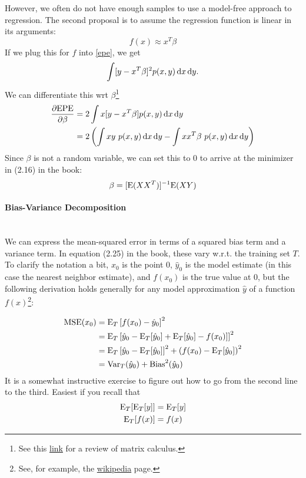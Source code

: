 However, we often do not have enough samples to use a model-free approach to regression. The second proposal is to assume the regression function is linear in its arguments:
$$
f(x) \approx x^T \beta
$$
If we plug this for $f$ into \eqref{epe}, we get
$$
\int [y - x^T \beta]^2 p(x, y) \operatorname{d}\!{x} \operatorname{d}\!{y}.
$$
We can differentiate this wrt $\beta$\footnote{See this \href{https://www.matrixcalculus.org/}{link} for a review of matrix calculus.}
\begin{align*}
  \frac{\partial \mathrm{EPE}}{\partial \beta} &= 2 \int x [y - x^T \beta] p(x, y) \d x \d y\\
                                               &= 2\left(\int x y\ p(x, y)\d x \d y - \int xx^T\beta\ p(x, y) \d x \d y\right)
\end{align*}
Since $\beta$ is not a random variable, we can set this to $0$ to arrive at the minimizer in (2.16) in the book:
$$
\beta = [\mathrm{E} (XX^T)]^{-1} \mathrm{E} (XY)
$$

\paragraph{Bias-Variance Decomposition}\mbox{} \\

We can express the mean-squared error in terms of a squared bias term and a variance term. In equation (2.25) in the book, these vary w.r.t. the training set $T$. To clarify the notation a bit, 
$x_0$ is the point $0$, $\hat{y}_0$ is the model estimate (in this case the nearest neighbor estimate), and $f(x_0)$ is the true value at $0$, but the following derivation holds generally for any model approximation $\hat{y}$ of a function $f(x)$\footnote{See, for example, the \href{https://en.wikipedia.org/wiki/Bias-variance_tradeoff}{wikipedia} page.}:

\begin{align*}
  \mathrm{MSE}(x_0) &= \mathrm{E}_{T}\left[f(x_0) - \hat{y}_0\right]^2\\
                    &= \mathrm{E}_{T}\left[\hat{y}_0 - \mathrm{E}_{T}[\hat{y}_0] + \mathrm{E}_{T}[\hat{y}_0] - f(x_0)]\right]^2\\
                    &= \mathrm{E}_{T}\left[\hat{y}_0 - \mathrm{E}_{T}[\hat{y}_0]\right]^2 + \left(f(x_0) - \mathrm{E}_{T}[\hat{y}_0]\right)^2\\
                    &= \mathrm{Var}_{T}(\hat{y}_0) + \mathrm{Bias}^2(\hat{y}_0)
\end{align*}
It is a somewhat instructive exercise to figure out how to go from the second line to the third. Easiest if you recall that
\begin{align*}
  \mathrm{E}_{T}[\mathrm{E}_{T}[y]] &= \mathrm{E}_{T}[y]\\
\mathrm{E}_{T}[f(x)] &= f(x)
\end{align*}

